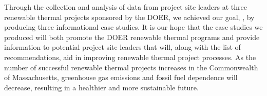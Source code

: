 \par Through the collection and analysis of data from project site leaders at three renewable thermal projects sponsored by the DOER, we achieved our goal, \goal, by producing three informational case studies. It is our hope that the case studies we produced will both promote the DOER renewable thermal programs and provide information to potential project site leaders that will, along with the list of recommendations, aid in improving renewable thermal project processes. As the number of successful renewable thermal projects increases in the Commonwealth of Massachusetts, greenhouse gas emissions and fossil fuel dependence will decrease, resulting in a healthier and more sustainable future.